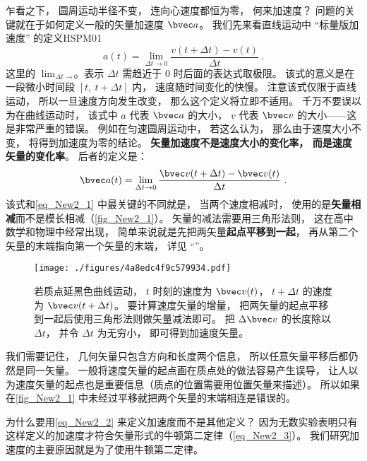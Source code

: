 乍看之下， 圆周运动半径不变， 连向心速度都恒为零， 何来加速度？ 问题的关键就在于如何定义一般的矢量加速度 $\bvec a$。 我们先来看直线运动中 “标量版加速度” 的定义{HSPM01}
\begin{equation}\label{eq_New2_1}
a(t) = \lim_{\Delta t\to 0}\frac{v(t+\Delta t) - v(t)}{\Delta t}~.
\end{equation}
这里的 $\lim_{\Delta t\to 0}$ 表示 $\Delta t$ 需趋近于 0 时后面的表达式取极限。 该式的意义是在一段微小时间段 $[t,\ t+\Delta t]$ 内， 速度随时间变化的快慢。 注意该式仅限于直线运动， 所以一旦速度方向发生改变， 那么这个定义将立即不适用。 千万不要误以为在曲线运动时， 该式中 $a$ 代表 $\bvec a$ 的大小， $v$ 代表 $\bvec v$ 的大小——这是非常严重的错误。 例如在匀速圆周运动中， 若这么认为， 那么由于速度大小不变， 将得到加速度为零的结论。 \textbf{矢量加速度不是速度大小的变化率， 而是速度矢量的变化率}。 后者的定义是：
\begin{equation}\label{eq_New2_2}
\bvec a(t) = \lim_{\Delta t\to 0}\frac{\bvec v(t+\Delta t) - \bvec v(t)}{\Delta t}~.
\end{equation}
该式和\autoref{eq_New2_1} 中最关键的不同就是， 当两个速度相减时， 使用的是\textbf{矢量相减}而不是模长相减（\autoref{fig_New2_1}）。 矢量的减法需要用三角形法则， 这在高中数学和物理中经常出现， 简单来说就是先把两矢量\textbf{起点平移到一起}， 再从第二个矢量的末端指向第一个矢量的末端， 详见 “”。

\begin{figure}[ht]
\centering
\texttt{[image: ./figures/4a8edc4f9c579934.pdf]}
\caption{若质点延黑色曲线运动， $t$ 时刻的速度为 $\bvec v(t)$， $t+\Delta t$ 的速度为 $\bvec v(t+\Delta t)$。 要计算速度矢量的增量， 把两矢量的起点平移到一起后使用三角形法则做矢量减法即可。 把 $\Delta \bvec v$ 的长度除以 $\Delta t$， 并令 $\Delta t$ 为无穷小， 即可得到加速度矢量。} \label{fig_New2_1}
\end{figure}

我们需要记住， 几何矢量只包含方向和长度两个信息， 所以任意矢量平移后都仍然是同一矢量。 一般将速度矢量的起点画在质点处的做法容易产生误导， 让人以为速度矢量的起点也是重要信息（质点的位置需要用位置矢量来描述）。 所以如果在\autoref{fig_New2_1} 中未经过平移就把两个矢量的末端相连是错误的。

为什么要用\autoref{eq_New2_2} 来定义加速度而不是其他定义？ 因为无数实验表明只有这样定义的加速度才符合矢量形式的牛顿第二定律（\autoref{eq_New2_3}）。 我们研究加速度的主要原因就是为了使用牛顿第二定律。

